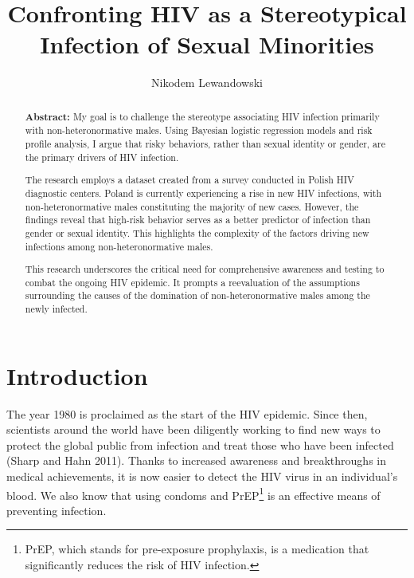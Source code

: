 \documentclass[
  12pt,
  letterpaper,
  DIV=11,
  numbers=noendperiod]{scrartcl}
\title{Confronting HIV as a Stereotypical Infection of Sexual
Minorities}
\author{Nikodem Lewandowski}
\date{}
\begin{document}
\maketitle
\ifdefined\Shaded\renewenvironment{Shaded}{\begin{tcolorbox}[boxrule=0pt, enhanced, breakable, sharp corners, frame hidden, borderline west={3pt}{0pt}{shadecolor}, interior hidden]}{\end{tcolorbox}}\fi

\begin{abstract}

\textbf{Abstract:} My goal is to challenge the stereotype associating HIV infection primarily with non-heteronormative males. Using Bayesian logistic regression models and risk profile analysis, I argue that risky behaviors, rather than sexual identity or gender, are the primary drivers of HIV infection.

The research employs a dataset created from a survey conducted in Polish HIV diagnostic centers. Poland is currently experiencing a rise in new HIV infections, with non-heteronormative males constituting the majority of new cases. However, the findings reveal that high-risk behavior serves as a better predictor of infection than gender or sexual identity. This highlights the complexity of the factors driving new infections among non-heteronormative males.

This research underscores the critical need for comprehensive awareness and testing to combat the ongoing HIV epidemic. It prompts a reevaluation of the assumptions surrounding the causes of the domination of non-heteronormative males among the newly infected.

\end{abstract}

\vspace{12mm}

\hypertarget{introduction}{%
\section{Introduction}\label{introduction}}

The year 1980 is proclaimed as the start of the HIV epidemic. Since
then, scientists around the world have been diligently working to find
new ways to protect the global public from infection and treat those who
have been infected (Sharp and Hahn 2011). Thanks to increased awareness
and breakthroughs in medical achievements, it is now easier to detect
the HIV virus in an individual's blood. We also know that using condoms
and PrEP\footnote{PrEP, which stands for pre-exposure prophylaxis, is a
  medication that significantly reduces the risk of HIV infection.} is
an effective means of preventing infection.
\end{document}
